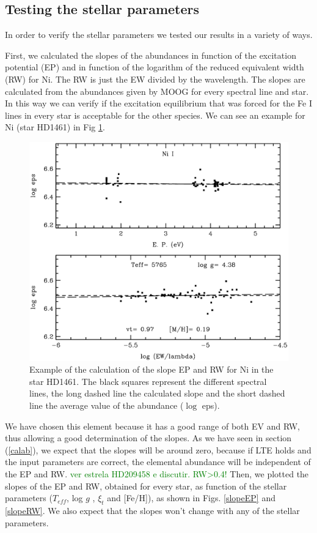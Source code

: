 \documentclass[dvips,12pt,a4paper]{report}
\begin{document}
{{%

\subsection {Testing the stellar parameters}

In order to verify the stellar parameters we tested our results in a variety of ways. 

First, we calculated the slopes of the abundances in function of the excitation potential (EP) and in function of the logarithm of the reduced equivalent width (RW) for Ni. The RW is just the EW divided by the wavelength. The slopes are calculated from the abundances given by MOOG for every spectral line and star. In this way we can verify if the excitation equilibrium that was forced for the Fe I lines in every star is acceptable for the other species. We can see an example for Ni (star HD1461) in Fig \ref{exslope}.
\begin{figure}[h]
\centering
\includegraphics[width= 10 cm]{pics/parte3/moogpicniq.eps}
\caption[Example of the calculation for Ni of the slope EP and RW]{Example of the calculation of the slope EP and RW for Ni in the star HD1461. The black squares represent the different spectral lines, the long dashed line the calculated slope and the short dashed line the average value of the abundance ($\log$ eps).}
\label{exslope}
\end{figure}
We have chosen this element because it has a good range of both EV and RW, thus allowing a good determination of the slopes. As we have seen in section (\ref{calab}), we expect that the slopes will be around zero, because if LTE holds and the input parameters are correct, the elemental abundance will be independent of the EP and RW. \textcolor{green}{ver estrela HD209458 e discutir. RW>0.4!} Then, we plotted the slopes of the EP and RW, obtained for every star, as function of the stellar parameters ($T_{eff}$, log $g$ , $\xi_t$ and [Fe/H]), as shown in Figs. \ref{slopeEP} and \ref{slopeRW}. We also expect that the slopes won't change with any of the stellar parameters.


}}
\end{document}
